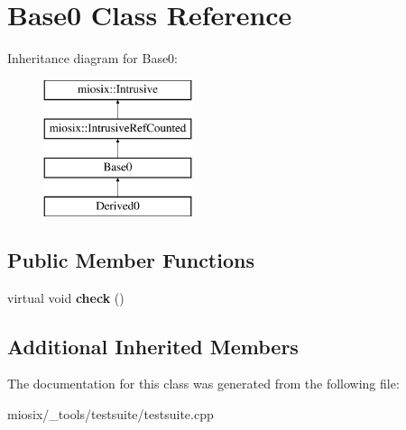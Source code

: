 \hypertarget{class_base0}{\section{Base0 Class Reference}
\label{class_base0}
}
Inheritance diagram for Base0\-:\begin{figure}[H]
\begin{center}
\leavevmode
\includegraphics[height=4.000000cm]{class_base0}
\end{center}
\end{figure}
\subsection*{Public Member Functions}
\begin{DoxyCompactItemize}
\item 
\hypertarget{class_base0_a38845cdc1361eddb5b326505c30c2a44}{virtual void {\bfseries check} ()}\label{class_base0_a38845cdc1361eddb5b326505c30c2a44}

\end{DoxyCompactItemize}
\subsection*{Additional Inherited Members}


The documentation for this class was generated from the following file\-:\begin{DoxyCompactItemize}
\item 
miosix/\-\_\-tools/testsuite/testsuite.\-cpp\end{DoxyCompactItemize}
